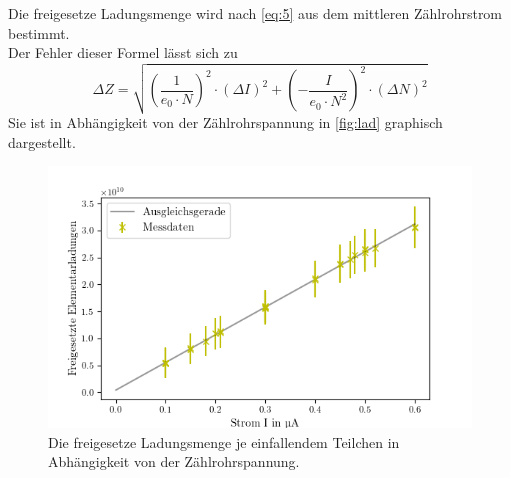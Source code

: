 Die freigesetze Ladungsmenge wird nach \autoref{eq:5} aus dem mittleren Zählrohrstrom
bestimmt.\\
Der Fehler dieser Formel lässt sich zu %
\begin{equation*}
  \Delta Z = \sqrt{ ( \frac{1}{e_0 \cdot N} )^2 \cdot (\Delta I)^2 + (- \frac{I}{e_0 \cdot N^2})^2 \cdot (\Delta N)^2}
\end{equation*}
Sie ist in Abhängigkeit von der Zählrohrspannung in \autoref{fig:lad} graphisch dargestellt.\\
\begin{figure}[H]
  \centering
  \includegraphics{content/hobelneu.png}
  \caption{Die freigesetze Ladungsmenge je einfallendem Teilchen in Abhängigkeit von der Zählrohrspannung.}
  \label{fig:lad}
\end{figure}


